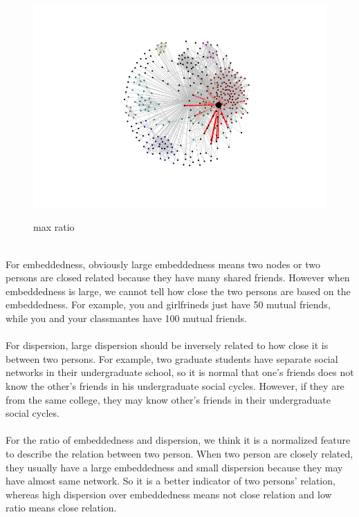 \documentclass{article}
\begin{document}
\begin{figure}[htbp]
{\begin{minipage}[b]{0.4\textwidth}
\includegraphics[width=1\textwidth]{5_7.png}
\caption*{max ratio}
\end{minipage}
\label{fig:p5_13}
}
\caption{}
\label{fig:p5_111213}
\end{figure}
\newpage
~\\
For embeddedness, obviously large embeddedness means two nodes or two persons are closed related because they have many shared friends. However when embeddedness is large, we cannot tell how close the two persons are based on the embeddedness. For example, you and girlfrineds just have 50 mutual friends, while you and your classmantes have 100 mutual friends.\\
\\
For dispersion, large dispersion should be inversely related to how close it is between two persons. For example, two graduate students have separate social networks in their undergraduate school, so it is normal that one's friends does not know the other's friends in his undergraduate social cycles. However, if they are from the same college, they may know other's friends in their undergraduate social cycles. \\
\\
For the ratio of embeddedness and dispersion, we think it is a normalized feature to describe the relation between two person. When two person are closely related, they usually have a large embeddedness and small dispersion because they may have almost same network. So it is a better indicator of two persons' relation, whereas high dispersion over embeddedness means not close relation and low ratio means close relation.\\
\end{document}
